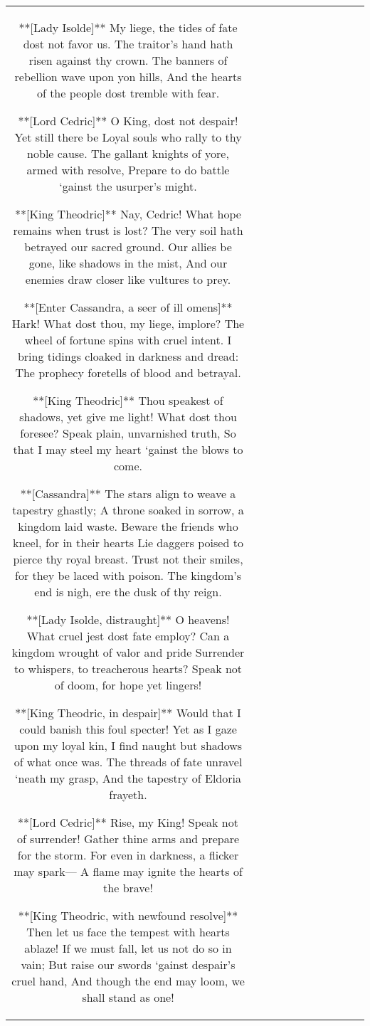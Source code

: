 \begin{table}[h!]
\begin{tabular}{|c|c|c|c|c|c|c|c|c|c|c|}
**[Lady Isolde]**  
My liege, the tides of fate dost not favor us.  
The traitor’s hand hath risen against thy crown.  
The banners of rebellion wave upon yon hills,  
And the hearts of the people dost tremble with fear.

**[Lord Cedric]**  
O King, dost not despair! Yet still there be  
Loyal souls who rally to thy noble cause.  
The gallant knights of yore, armed with resolve,  
Prepare to do battle ‘gainst the usurper’s might.

**[King Theodric]**  
Nay, Cedric! What hope remains when trust is lost?  
The very soil hath betrayed our sacred ground.  
Our allies be gone, like shadows in the mist,  
And our enemies draw closer like vultures to prey.

**[Enter Cassandra, a seer of ill omens]**  
Hark! What dost thou, my liege, implore?  
The wheel of fortune spins with cruel intent.  
I bring tidings cloaked in darkness and dread:  
The prophecy foretells of blood and betrayal.

**[King Theodric]**  
Thou speakest of shadows, yet give me light!  
What dost thou foresee? Speak plain, unvarnished truth,  
So that I may steel my heart ‘gainst the blows to come.

**[Cassandra]**  
The stars align to weave a tapestry ghastly;  
A throne soaked in sorrow, a kingdom laid waste.  
Beware the friends who kneel, for in their hearts  
Lie daggers poised to pierce thy royal breast.  
Trust not their smiles, for they be laced with poison.  
The kingdom’s end is nigh, ere the dusk of thy reign.

**[Lady Isolde, distraught]**  
O heavens! What cruel jest dost fate employ?  
Can a kingdom wrought of valor and pride  
Surrender to whispers, to treacherous hearts?  
Speak not of doom, for hope yet lingers!

**[King Theodric, in despair]**  
Would that I could banish this foul specter!  
Yet as I gaze upon my loyal kin,  
I find naught but shadows of what once was.  
The threads of fate unravel ‘neath my grasp,  
And the tapestry of Eldoria frayeth.

**[Lord Cedric]**  
Rise, my King! Speak not of surrender!  
Gather thine arms and prepare for the storm.  
For even in darkness, a flicker may spark—  
A flame may ignite the hearts of the brave!

**[King Theodric, with newfound resolve]**  
Then let us face the tempest with hearts ablaze!  
If we must fall, let us not do so in vain;  
But raise our swords ‘gainst despair’s cruel hand,  
And though the end may loom, we shall stand as one! 


\end{tabular}
\end{table}
